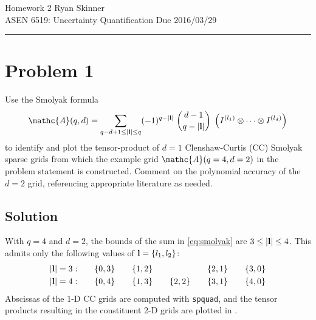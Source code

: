 \documentclass[11pt]{article}
\begin{document}
\newcommand{\widesim}[2][1.5]{
  \mathrel{\overset{#2}{\scalebox{#1}[1]{$\sim$}}}
}

\pagestyle{fancyplain}
\lhead{}
\chead{}
\rhead{}
\cfoot{\hrule \thepage}

\noindent
{\Large Homework 2}
\hfill
{\large Ryan Skinner}
\\[0.5ex]
{\large ASEN 6519: Uncertainty Quantification}
\hfill
{\large Due 2016/03/29}\\
\hrule
\vspace{6pt}

\section*{Problem 1} %

Use the Smolyak formula
\begin{equation}
\mathc{A}(q,d) = \sum_{q-d+1 \le |\mb{l}| \le q} (-1)^{q-|\mb{l}|} \; \binom{d-1}{q-|\mb{l}|} \; \left( I^{(l_1)} \otimes \cdots \otimes I^{(l_d)} \right)
\label{eq:smolyak}
\end{equation}
to identify and plot the tensor-product of $d=1$ Clenshaw-Curtis (CC) Smolyak sparse grids from which the example grid $\mathc{A}(q=4,d=2)$ in the problem statement is constructed. Comment on the polynomial accuracy of the $d=2$ grid, referencing appropriate literature as needed.

\subsection*{Solution}

With $q=4$ and $d=2$, the bounds of the sum in \eqref{eq:smolyak} are $3 \le |\mb{l}| \le 4$. This admits only the following values of $\mb{l} = \{ l_1, l_2 \}$:
\begin{align*}
|\mb{l}| = 3: &\qquad \{ 0,3 \} \qquad \{ 1,2 \} \qquad \hphantom{\{ 2,2 \}} \qquad \{ 2,1 \} \qquad \{ 3,0 \} \\
|\mb{l}| = 4: &\qquad \{ 0,4 \} \qquad \{ 1,3 \} \qquad \{ 2,2 \} \qquad \{ 3,1 \} \qquad \{ 4,0 \}
\end{align*}
Abscissas of the 1-D CC grids are computed with \lstinline|spquad|, and the tensor products resulting in the constituent 2-D grids are plotted in .
\end{document}
